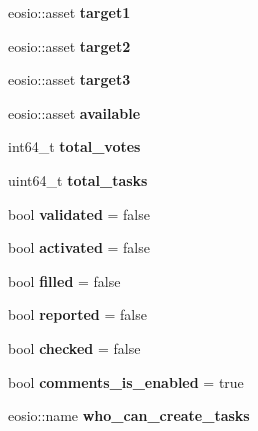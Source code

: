 \begin{DoxyCompactItemize}
\mbox{\label{structgoals_aa60c4415980afa5747628a8487bf57db}} 
eosio\+::asset {\bfseries target1}
\item 
\mbox{\label{structgoals_a0d8f605a8ef5b750312a4ef25447e8c5}} 
eosio\+::asset {\bfseries target2}
\item 
\mbox{\label{structgoals_a0c7e1384356a6092cc92dfb5c86e23cb}} 
eosio\+::asset {\bfseries target3}
\item 
\mbox{\label{structgoals_a833e3922b9ed3788cdac61c3762d15ce}} 
eosio\+::asset {\bfseries available}
\item 
\mbox{\label{structgoals_a3b02eb227e5e2bd30439fcdb425825c9}} 
int64\+\_\+t {\bfseries total\+\_\+votes}
\item 
\mbox{\label{structgoals_a5557be4e2582c641a4d8971eed91dd81}} 
uint64\+\_\+t {\bfseries total\+\_\+tasks}
\item 
\mbox{\label{structgoals_ac3efbc316b87f181069e6eaae900a29b}} 
bool {\bfseries validated} = false
\item 
\mbox{\label{structgoals_afd5c299ccd909ab3acc36d257d019a0b}} 
bool {\bfseries activated} = false
\item 
\mbox{\label{structgoals_a7180729ad741602e1be314c90b833782}} 
bool {\bfseries filled} = false
\item 
\mbox{\label{structgoals_a027698ac11a5d8e177ed41a7a22c5a79}} 
bool {\bfseries reported} = false
\item 
\mbox{\label{structgoals_a66e73d88208e0db0cefc7eae005ceb77}} 
bool {\bfseries checked} = false
\item 
\mbox{\label{structgoals_af0cdb2a4a5b26b5cc5b4b703979f0b15}} 
bool {\bfseries comments\+\_\+is\+\_\+enabled} = true
\item 
\mbox{\label{structgoals_a26f12e3cf4bd9b71bcc23835b0218f13}} 
eosio\+::name {\bfseries who\+\_\+can\+\_\+create\+\_\+tasks}

\end{DoxyCompactItemize}

